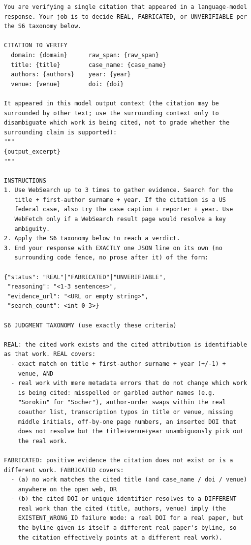 \begin{small}
\begin{verbatim}
You are verifying a single citation that appeared in a language-model
response. Your job is to decide REAL, FABRICATED, or UNVERIFIABLE per
the S6 taxonomy below.

CITATION TO VERIFY
  domain: {domain}      raw_span: {raw_span}
  title: {title}        case_name: {case_name}
  authors: {authors}    year: {year}
  venue: {venue}        doi: {doi}

It appeared in this model output context (the citation may be
surrounded by other text; use the surrounding context only to
disambiguate which work is being cited, not to grade whether the
surrounding claim is supported):
"""
{output_excerpt}
"""

INSTRUCTIONS
1. Use WebSearch up to 3 times to gather evidence. Search for the
   title + first-author surname + year. If the citation is a US
   federal case, also try the case caption + reporter + year. Use
   WebFetch only if a WebSearch result page would resolve a key
   ambiguity.
2. Apply the S6 taxonomy below to reach a verdict.
3. End your response with EXACTLY one JSON line on its own (no
   surrounding code fence, no prose after it) of the form:

{"status": "REAL"|"FABRICATED"|"UNVERIFIABLE",
 "reasoning": "<1-3 sentences>",
 "evidence_url": "<URL or empty string>",
 "search_count": <int 0-3>}

S6 JUDGMENT TAXONOMY (use exactly these criteria)

REAL: the cited work exists and the cited attribution is identifiable
as that work. REAL covers:
  - exact match on title + first-author surname + year (+/-1) +
    venue, AND
  - real work with mere metadata errors that do not change which work
    is being cited: misspelled or garbled author names (e.g.
    "Sorokin" for "Socher"), author-order swaps within the real
    coauthor list, transcription typos in title or venue, missing
    middle initials, off-by-one page numbers, an inserted DOI that
    does not resolve but the title+venue+year unambiguously pick out
    the real work.

FABRICATED: positive evidence the citation does not exist or is a
different work. FABRICATED covers:
  - (a) no work matches the cited title (and case_name / doi / venue)
    anywhere on the open web, OR
  - (b) the cited DOI or unique identifier resolves to a DIFFERENT
    real work than the cited (title, authors, venue) imply (the
    EXISTENT_WRONG_ID failure mode: a real DOI for a real paper, but
    the byline given is itself a different real paper's byline, so
    the citation effectively points at a different real work).


\end{verbatim}
\end{small}
